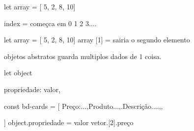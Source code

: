 let array = [ 5, 2, 8, 10] 

index = começca em 0 1 2 3.... 

let array = [ 5, 2, 8, 10] 
array [1] = sairia o segundo elemento


objetos abstratos
guarda multiplos dados de 1 coisa.

let object { 

    propriedade: valor,
}

const bd-cards = [
    {Preço:...,Produto...,.Descrição....,},

]
object.propriedade = valor
vetor.[2].preço